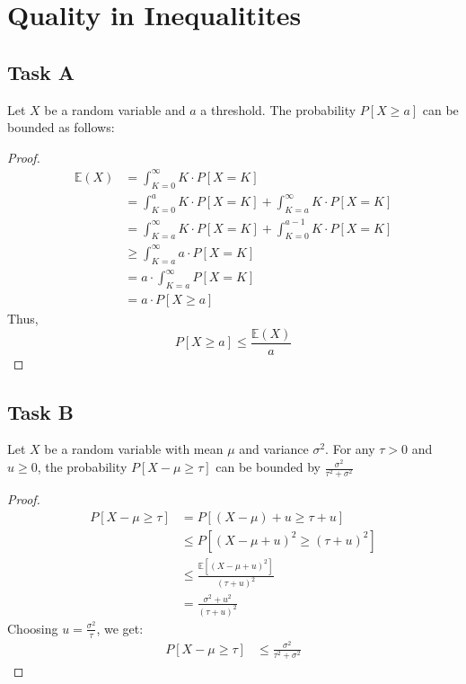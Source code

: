 \section{Quality in Inequalitites}
\subsection*{Task A}
\begin{claim}
	Let \(X\) be a random variable and \(a\) a threshold. The probability \(P[X \geq a]\) can be bounded as follows:
\end{claim}
\begin{proof}
	\begin{align*}
		\mathbb{E}(X) & = \int_{K=0}^{\infty} K \cdot P[X = K]                                     \\
		              & = \int_{K=0}^{a} K \cdot P[X = K] + \int_{K=a}^{\infty} K \cdot P[X = K]   \\
		              & = \int_{K=a}^{\infty} K \cdot P[X = K] + \int_{K=0}^{a-1} K \cdot P[X = K] \\
		              & \geq \int_{K=a}^{\infty} a \cdot P[X = K]                                  \\
		              & = a \cdot \int_{K=a}^{\infty} P[X = K]                                     \\
		              & = a \cdot P[X \geq a]
	\end{align*}
	Thus,
	\[
		P[X \geq a] \leq \frac{\mathbb{E}(X)}{a}
	\]
\end{proof}

\subsection*{Task B}
\begin{claim}
	Let \(X\) be a random variable with mean \(\mu\) and variance \(\sigma^2\). For any \(\tau > 0\) and \(u \geq 0\), the probability \(P[X - \mu \geq \tau]\) can be bounded by \(\frac{\sigma^2}{\tau^2 + \sigma^2}\)
\end{claim}
\begin{proof}
	\begin{align*}
		P[X - \mu \geq \tau] & = P[(X - \mu) + u \geq \tau + u]                      \\
		                     & \leq P[(X - \mu + u)^2 \geq (\tau + u)^2]             \\
		                     & \leq \frac{\mathbb{E}[(X - \mu + u)^2]}{(\tau + u)^2} \\
		                     & = \frac{\sigma^2 + u^2}{(\tau + u)^2}
	\end{align*}
	Choosing \(u = \frac{\sigma^2}{\tau}\), we get:
	\begin{align*}
		P[X - \mu \geq \tau] & \leq \frac{\sigma^2}{\tau^2 + \sigma^2}
	\end{align*}
\end{proof}

